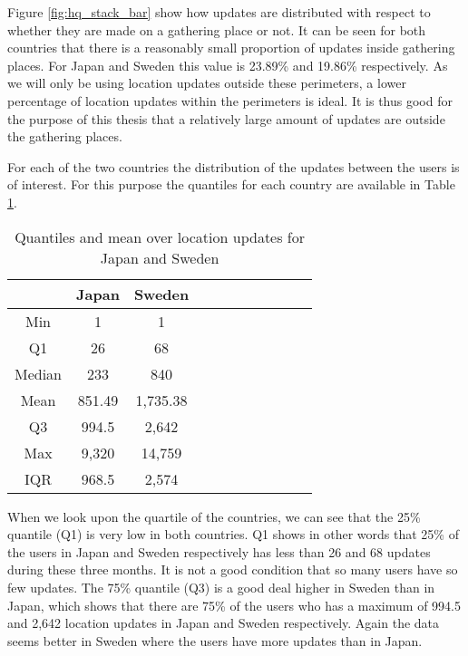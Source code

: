 Figure \ref{fig:hq_stack_bar} show how updates are distributed with respect to whether they are made on a gathering place or not. It can be seen for both countries that there is a reasonably small proportion of updates inside gathering places. For Japan and Sweden this value is 23.89\% and 19.86\% respectively. 
As we will only be using location updates outside these perimeters, a lower percentage of location updates within the perimeters is ideal. It is thus good for the purpose of this thesis that a relatively large amount of updates are outside the gathering places.

For each of the two countries the distribution of the updates between the users is of interest. For this purpose the quantiles for each country are available in Table \ref{tab:stat_loc_updates}. 


\begin{table}[htbp]
        \centering
        \small
        \setlength\tabcolsep{2pt}
        \begin{tabular}{|c|c|c|c|c|c|c|c|c|c|c|}
            \hline
                         & Japan      &   Sweden      \\[-1pt]
            \hline
                 Min     &    1       &   1           \\
            \hline
                 Q1      &  26        &   68      \\
            \hline
                 Median  & 233     &   840      \\
            \hline
                 Mean    &  851.49   &  1,735.38     \\
            \hline
                 Q3      & 994.5    &   2,642     \\
            \hline
                 Max     &  9,320 &  14,759     \\
            \hline
                 IQR     &  968.5   &   2,574     \\
            \hline
            
        \end{tabular}
        \caption{Quantiles and mean over location updates for Japan and Sweden} %
        \label{tab:stat_loc_updates}
\end{table}


When we look upon the quartile of the countries, we can see that the 25\% quantile (Q1) is very low in both countries. Q1 shows in other words that 25\% of the users in Japan and Sweden respectively has less than 26 and 68 updates during these three months. It is not a good condition that so many users have so few updates. The 75\% quantile (Q3) is a good deal higher in Sweden than in Japan, which shows that there are 75\% of the users who has a maximum of 994.5 and 2,642 location updates in Japan and Sweden respectively. Again the data seems better in Sweden where the users have more updates than in Japan. \\ 


